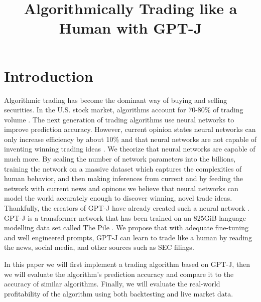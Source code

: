 \documentclass[conference]{IEEEtran}
\begin{document}
\title{Algorithmically Trading like a Human with GPT-J}

\author{
}


\maketitle

\begin{abstract}
    \lipsum[1]
\end{abstract}

\section{Introduction}
Algorithmic trading has become the dominant way of buying and selling securities. In the U.S. stock market, algorithms account for 70-80\% of trading volume \cite{Samuelsson2021}. The next generation of trading algorithms use neural networks to improve prediction accuracy. However, current opinion states neural networks can only increase efficiency by about 10\% and that neural networks are not capable of inventing winning trading ideas \cite{Vonko2021}. We theorize that neural networks are capable of much more. By scaling the number of network parameters into the billions, training the network on a massive dataset which captures the complexities of human behavior, and then making inferences from current  and by feeding the network with current news and opinons we believe that neural networks can model the world accurately enough to discover winning, novel trade ideas. Thankfully, the creators of GPT-J have already created such a neural network \cite{mesh-transformer-jax}. GPT-J is a transformer network \cite{Vaswani2017} that has been trained on an 825GiB language modelling data set called The Pile \cite{Gao2021}. We propose that with adequate fine-tuning and well engineered prompts, GPT-J can learn to trade like a human by reading the news, social media, and other sources such as SEC filings.

In this paper we will first implement a trading algorithm based on GPT-J, then we will evaluate the algorithm's prediction accuracy and compare it to the accuracy of similar algorithms. Finally, we will evaluate the real-world profitability of the algorithm using both backtesting and live market data. 
\end{document}

